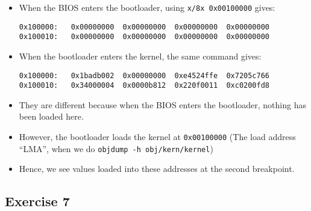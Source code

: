 \documentclass[]{article}
\begin{document}
\begin{itemize}
\item
  When the BIOS enters the bootloader, using \texttt{x/8x 0x00100000}
  gives:

\begin{verbatim}
0x100000:   0x00000000  0x00000000  0x00000000  0x00000000
0x100010:   0x00000000  0x00000000  0x00000000  0x00000000
\end{verbatim}
\item
  When the bootloader enters the kernel, the same command gives:

\begin{verbatim}
0x100000:   0x1badb002  0x00000000  0xe4524ffe  0x7205c766
0x100010:   0x34000004  0x0000b812  0x220f0011  0xc0200fd8
\end{verbatim}
\item
  They are different because when the BIOS enters the bootloader,
  nothing has been loaded here.
\item
  However, the bootloader loads the kernel at \texttt{0x00100000} (The
  load address ``LMA'', when we do \texttt{objdump -h obj/kern/kernel})
\item
  Hence, we see values loaded into these addresses at the second
  breakpoint.
\end{itemize}

\subsection{Exercise 7}
\end{document}
